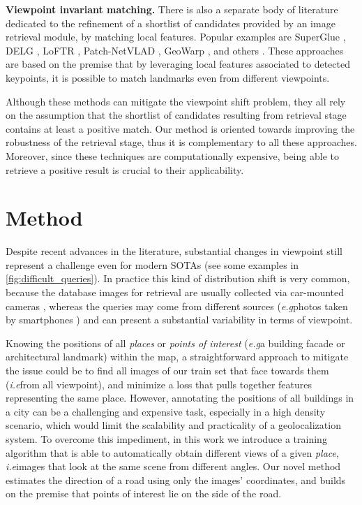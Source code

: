 \documentclass[10pt,twocolumn,letterpaper]{article}
\def\eg{\emph{e.g}\onedot}
\def\ie{\emph{i.e}\onedot}
\newcommand{\myparagraph}[1]{\vspace{4pt}\noindent\textbf{#1}}
\begin{document}
\myparagraph{Viewpoint invariant matching.}
There is also a separate body of literature dedicated to the refinement of a shortlist of candidates provided by an image retrieval module, by matching local features. Popular examples are SuperGlue \cite{Sarlin_2020_superglue}, DELG \cite{Cao_2020_delg}, LoFTR \cite{Sun_2021_loftr}, Patch-NetVLAD \cite{Hausler_2021_patch_netvlad}, GeoWarp \cite{Berton_2021_geowarp}, and others \cite{Wang_2022_TransVPR, Fuwen_2021_reranking_transformers}. These approaches are based on the premise that by leveraging local features associated to detected keypoints, it is possible to match landmarks even from different viewpoints. 


Although these methods can mitigate the viewpoint shift problem, they all rely on the assumption that the shortlist of candidates resulting from retrieval stage contains at least a positive match. Our method is oriented towards improving the robustness of the retrieval stage, thus it is complementary to all these approaches. Moreover, since these techniques are computationally expensive, being able to retrieve a positive result is crucial to their applicability.
 
\section{Method}
\label{sec:method}
Despite recent advances in the literature, substantial changes in viewpoint still represent a challenge even for modern SOTAs (see some examples in \cref{fig:difficult_queries}).
In practice this kind of distribution shift is very common, because the database images for retrieval are usually collected via car-mounted cameras \cite{Torii_2015_pitts250k, Torii_2018_tokyo247, Maddern_2017_robotCar, Berton_2021_svox, Alibey_2022_gsvcities, Milford_2008_st_lucia, Chen_2011_san_francisco, Warburg_2020_msls}, whereas the queries may come from different sources (\eg photos taken by smartphones \cite{Torii_2018_tokyo247, Chen_2011_san_francisco, Berton_2022_cosPlace}) and can present a substantial variability in terms of viewpoint. 

Knowing the positions of all \textit{places} or \textit{points of interest} (\eg a building facade or architectural landmark) within the map, a straightforward approach to mitigate the issue could be to find all images of our train set that face towards them (\ie from all viewpoint), and minimize a loss that pulls together features representing the same place.
However, annotating the positions of all buildings in a city can be a challenging and expensive task, especially in a high density scenario, which would limit the scalability and practicality of a geolocalization system.
To overcome this impediment, in this work we introduce a training algorithm that is able to automatically obtain different views of a given \textit{place}, \ie images that look at the same scene from different angles. Our novel method estimates the direction of a road using only the images' coordinates, and builds on the premise that points of interest lie on the side of the road.
\end{document}

